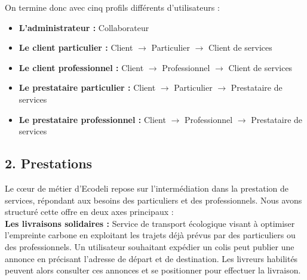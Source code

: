 \documentclass{report}
\begin{document}
\noindent On termine donc avec cinq profils différents d'utilisateurs :
\begin{itemize}
    \item \textbf{L’administrateur :} Collaborateur
    \item \textbf{Le client particulier :} Client $\rightarrow$ Particulier $\rightarrow$ Client de services
    \item \textbf{Le client professionnel :} Client $\rightarrow$ Professionnel $\rightarrow$ Client de services
    \item \textbf{Le prestataire particulier :} Client $\rightarrow$ Particulier $\rightarrow$ Prestataire de services
    \item \textbf{Le prestataire professionnel :} Client $\rightarrow$ Professionnel $\rightarrow$ Prestataire de services
\end{itemize}
\vspace{0.5cm}

\subsection*{2. Prestations} 
\vspace{0.2cm} 
\noindent Le cœur de métier d’Ecodeli repose sur l’intermédiation dans la prestation de services, répondant aux besoins des particuliers et des professionnels. Nous avons structuré cette offre en deux axes principaux : \\

\noindent \textbf{Les livraisons solidaires :} Service de transport écologique visant à optimiser l’empreinte carbone en exploitant les trajets déjà prévus par des particuliers ou des professionnels. Un utilisateur souhaitant expédier un colis peut publier une annonce en précisant l’adresse de départ et de destination. Les livreurs habilités peuvent alors consulter ces annonces et se positionner pour effectuer la livraison. \\
\end{document}
